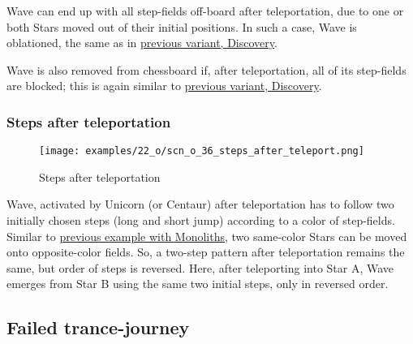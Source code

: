 Wave can end up with all step-fields off-board after teleportation, due to one or
both Stars moved out of their initial positions. In such a case, Wave is oblationed,
the same as in
\hyperref[fig:scn_d_16_wave_teleported_off_board]{previous variant, Discovery}.

Wave is also removed from chessboard if, after teleportation, all of its step-fields
are blocked; this is again similar to
\hyperref[fig:scn_d_15_teleported_wave_blocked]{previous variant, Discovery}.

\clearpage %

\subsubsection*{Steps after teleportation}
\label{sec:One/Starchild/Activating Wave/Steps after teleportation}

\vspace*{-1.5\baselineskip}
\noindent
\begin{figure}[!h]
\texttt{[image: examples/22\_o/scn\_o\_36\_steps\_after\_teleport.png]}
\vspace*{-1.4\baselineskip}
\caption{Steps after teleportation}
\label{fig:scn_o_36_steps_after_teleport}
\end{figure}

\vspace*{-0.5\baselineskip}
Wave, activated by Unicorn (or Centaur) after teleportation has to follow two initially
chosen steps (long and short jump) according to a color of step-fields. Similar to
\hyperref[fig:scn_d_19_steps_after_teleport_init]{previous example with Monoliths},
two same-color Stars can be moved onto opposite-color fields. So, a two-step pattern
after teleportation remains the same, but order of steps is reversed. Here, after
teleporting into Star A, Wave emerges from Star B using the same two initial steps,
only in reversed order.

\clearpage %

\subsection*{Failed trance-journey}
\label{sec:One/Starchild/Failed trance-journey}

